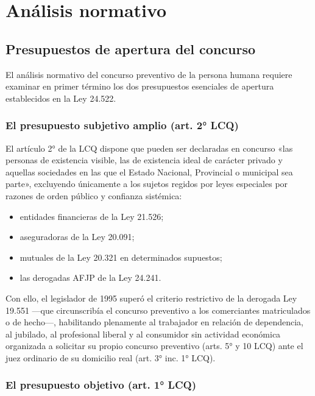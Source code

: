 \documentclass[12pt,oneside]{book}
\begin{document}
\chapter[Análisis normativo]{Análisis normativo}

\section{Presupuestos de apertura del concurso}

El análisis normativo del concurso preventivo de la persona humana requiere examinar en primer término los dos presupuestos esenciales de apertura establecidos en la Ley 24.522.

\subsection{El presupuesto subjetivo amplio (art. 2° LCQ)}

El artículo 2° de la LCQ dispone que pueden ser declaradas en concurso «las personas de existencia visible, las de existencia ideal de carácter privado y aquellas sociedades en las que el Estado Nacional, Provincial o municipal sea parte», excluyendo únicamente a los sujetos regidos por leyes especiales por razones de orden público y confianza sistémica:

\begin{itemize}
    \item entidades financieras de la Ley 21.526;
    \item aseguradoras de la Ley 20.091;
    \item mutuales de la Ley 20.321 en determinados supuestos;
    \item las derogadas AFJP de la Ley 24.241.
\end{itemize}

Con ello, el legislador de 1995 superó el criterio restrictivo de la derogada Ley 19.551 ---que circunscribía el concurso preventivo a los comerciantes matriculados o de hecho---, habilitando plenamente al trabajador en relación de dependencia, al jubilado, al profesional liberal y al consumidor sin actividad económica organizada a solicitar su propio concurso preventivo (arts. 5° y 10 LCQ) ante el juez ordinario de su domicilio real (art. 3° inc. 1° LCQ).

\subsection{El presupuesto objetivo (art. 1° LCQ)}
\end{document}
